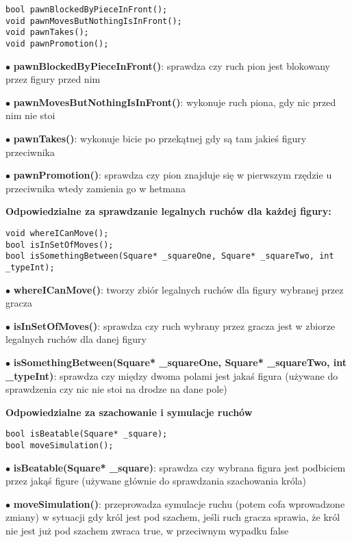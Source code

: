 \documentclass[]{report}
\begin{document}
\begin{flushleft}
\begin{lstlisting}
bool pawnBlockedByPieceInFront();
void pawnMovesButNothingIsInFront();
void pawnTakes();
void pawnPromotion();
\end{lstlisting}

$\bullet$ \textbf{pawnBlockedByPieceInFront()}: sprawdza czy ruch pion jest blokowany przez figury przed nim

$\bullet$ \textbf{pawnMovesButNothingIsInFront()}: wykonuje ruch piona, gdy nic przed nim nie stoi

$\bullet$ \textbf{pawnTakes()}: wykonuje bicie po przekątnej gdy są tam jakieś figury przeciwnika

$\bullet$ \textbf{pawnPromotion()}: sprawdza czy pion znajduje się w pierwszym rzędzie u przeciwnika wtedy zamienia go w hetmana

 \textbf{Odpowiedzialne za sprawdzanie legalnych ruchów dla każdej figury:}

\begin{lstlisting}
void whereICanMove();
bool isInSetOfMoves();
bool isSomethingBetween(Square* _squareOne, Square* _squareTwo, int _typeInt);
\end{lstlisting}

$\bullet$ \textbf{whereICanMove()}: tworzy zbiór legalnych ruchów dla figury wybranej przez gracza

$\bullet$ \textbf{isInSetOfMoves()}: sprawdza czy ruch wybrany przez gracza jest w zbiorze legalnych ruchów dla danej figury

$\bullet$ \textbf{isSomethingBetween(Square* \_squareOne, Square* \_squareTwo, int \_typeInt)}: sprawdza czy między dwoma polami jest jakaś figura (używane do sprawdzenia czy nic nie stoi na drodze na dane pole)

 \textbf{Odpowiedzialne za szachowanie i symulacje ruchów}

\begin{lstlisting}
bool isBeatable(Square* _square);
bool moveSimulation();
\end{lstlisting}

$\bullet$ \textbf{isBeatable(Square* \_square)}: sprawdza czy wybrana figura jest podbiciem przez jakąś figure (używane głównie do sprawdzania szachowania króla)

$\bullet$ \textbf{moveSimulation()}: przeprowadza symulacje ruchu (potem cofa wprowadzone zmiany) w sytuacji gdy król jest pod szachem, jeśli ruch gracza sprawia, że król nie jest już pod szachem zwraca true, w przeciwnym wypadku false


\end{flushleft}
\end{document}
